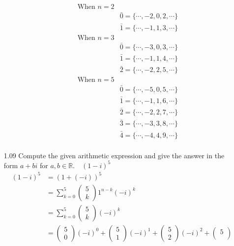 \documentclass[12pt]{article}
\newcommand{\R}{\mathbb{R}}
\begin{document}
\begin{enumerate}
\begin{enumerate}
		\begin{align*}
			\text{When } n=2 \\
			& \bar{0}=\{\cdots,-2,0,2,\cdots\}\\
			& \bar{1}=\{\cdots,-1,1,3,\cdots\}\\
			\text{When } n=3 \\
			& \bar{0}=\{\cdots,-3,0,3,\cdots\}\\
			& \bar{1}=\{\cdots,-1,1,4,\cdots\}\\
			& \bar{2}=\{\cdots,-2,2,5,\cdots\}\\
			\text{When } n=5 \\
			& \bar{0}=\{\cdots,-5,0,5,\cdots\}\\
			& \bar{1}=\{\cdots,-1,1,6,\cdots\}\\
			& \bar{2}=\{\cdots,-2,2,7,\cdots\}\\
			& \bar{3}=\{\cdots,-3,3,8,\cdots\}\\
			& \bar{4}=\{\cdots,-4,4,9,\cdots\}\\
		\end{align*}
	\end{enumerate}
	\item[1.09] Compute the given arithmetic expression and give the answer in the form $a + bi$ for $a,b \in \R .\quad (1-i)^5 $
		\begin{align*}
			(1-i)^5 &= (1+(-i))^5 \\
			&= \sum_{k=0}^{5} \begin{pmatrix}
								5\\
								k
							 \end{pmatrix} 1^{n-k}(-i)^k\\
			&= \sum_{k=0}^{5} \begin{pmatrix}
								5\\
								k
							 \end{pmatrix} (-i)^k\\
			&= \begin{pmatrix}
					5\\
					0
				\end{pmatrix} (-i)^0 + 
				\begin{pmatrix}
				5\\
				1
				\end{pmatrix} (-i)^1 + 
				\begin{pmatrix}
				5\\
				2
				\end{pmatrix} (-i)^2 + 
				\begin{pmatrix}
				5\\

\end{pmatrix}
\end{align*}
\end{enumerate}
\end{document}
